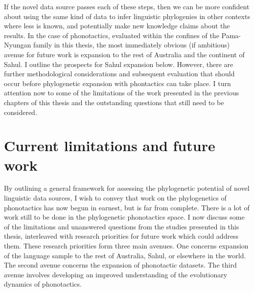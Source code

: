 If the novel data source passes each of these steps, then we can be more confident about using the same kind of data to infer linguistic phylogenies in other contexts where less is known, and potentially make new knowledge claims about the results. In the case of phonotactics, evaluated within the confines of the Pama-Nyungan family in this thesis, the most immediately obvious (if ambitious) avenue for future work is expansion to the rest of Australia and the continent of Sahul. I outline the prospects for Sahul expansion below. However, there are further methodological considerations and subsequent evaluation that should occur before phylogenetic expansion with phontactics can take place. I turn attention now to some of the limitations of the work presented in the previous chapters of this thesis and the outstanding questions that still need to be considered.

\hypertarget{current-limitations-and-future-work}{%
\section{Current limitations and future work}\label{current-limitations-and-future-work}}

By outlining a general framework for assessing the phylogenetic potential of novel linguistic data sources, I wish to convey that work on the phylogenetics of phonotactics has now begun in earnest, but is far from complete. There is a lot of work still to be done in the phylogenetic phonotactics space. I now discuss some of the limitations and unanswered questions from the studies presented in this thesis, interleaved with research priorities for future work which could address them. These research priorities form three main avenues. One concerns expansion of the language sample to the rest of Australia, Sahul, or elsewhere in the world. The second avenue concerns the expansion of phonotactic datasets. The third avenue involves developing an improved understanding of the evolutionary dynamics of phonotactics.

